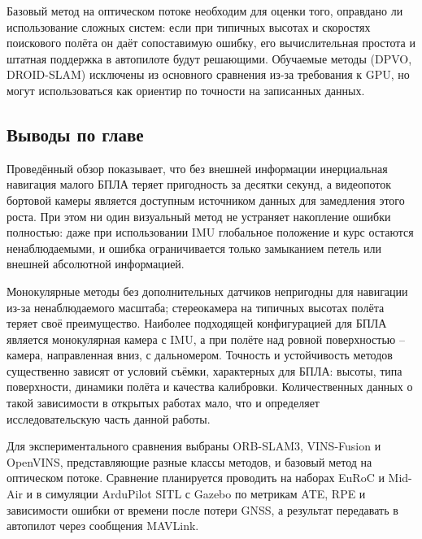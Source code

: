     Базовый метод на оптическом потоке необходим для оценки того, оправдано ли использование сложных систем: если при типичных высотах и скоростях поискового полёта он даёт сопоставимую ошибку, его вычислительная простота и штатная поддержка в автопилоте будут решающими.
    Обучаемые методы (DPVO, DROID-SLAM) исключены из основного сравнения из-за требования к GPU, но могут использоваться как ориентир по точности на записанных данных.

    \subsection{Выводы по главе}

    Проведённый обзор показывает, что без внешней информации инерциальная навигация малого БПЛА теряет пригодность за десятки секунд, а видеопоток бортовой камеры является доступным источником данных для замедления этого роста.
    При этом ни один визуальный метод не устраняет накопление ошибки полностью: даже при использовании IMU глобальное положение и курс остаются ненаблюдаемыми, и ошибка ограничивается только замыканием петель или внешней абсолютной информацией.

    Монокулярные методы без дополнительных датчиков непригодны для навигации из-за ненаблюдаемого масштаба; стереокамера на типичных высотах полёта теряет своё преимущество.
    Наиболее подходящей конфигурацией для БПЛА является монокулярная камера с IMU, а при полёте над ровной поверхностью -- камера, направленная вниз, с дальномером.
    Точность и устойчивость методов существенно зависят от условий съёмки, характерных для БПЛА: высоты, типа поверхности, динамики полёта и качества калибровки.
    Количественных данных о такой зависимости в открытых работах мало, что и определяет исследовательскую часть данной работы.

    Для экспериментального сравнения выбраны ORB-SLAM3, VINS-Fusion и OpenVINS, представляющие разные классы методов, и базовый метод на оптическом потоке.
    Сравнение планируется проводить на наборах EuRoC и Mid-Air и в симуляции ArduPilot SITL с Gazebo по метрикам ATE, RPE и зависимости ошибки от времени после потери GNSS, а результат передавать в автопилот через сообщения MAVLink.
    \clearpage
